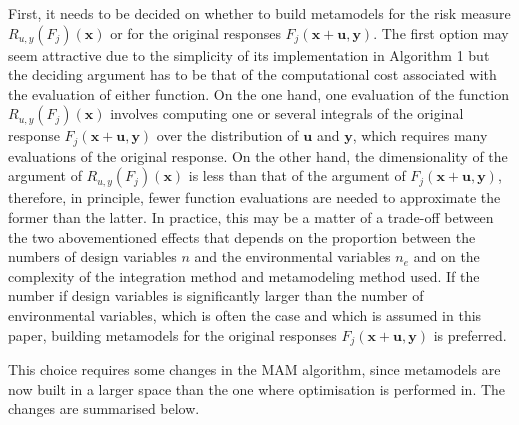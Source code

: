 \documentclass[10pt,twocolumn,a4paper]{article}
\begin{document}
First, it needs to be decided on whether to build metamodels for the risk measure $R_{u,y}(F_j)(\pmb x)$ or for the original responses $F_j (\pmb x+ \pmb u,\pmb y)$. The first option may seem attractive due to the simplicity of its implementation in Algorithm 1 but the deciding argument has to be that of the computational cost associated with the evaluation of either function. On the one hand, one evaluation of the function $R_{u,y}(F_j)(\pmb x)$ involves computing one or several integrals of the original response $F_j(\pmb x+ \pmb u,\pmb y)$ over the distribution of $\pmb u$ and $\pmb y$, which requires many evaluations of the original response. On the other hand, the dimensionality of the argument of $R_{u,y}(F_j)(\pmb x)$ is less than that of the argument of $F_j(\pmb x+ \pmb u,\pmb y)$, therefore, in principle, fewer function evaluations are needed to approximate the former than the latter. In practice, this may be a matter of a trade-off between the two abovementioned effects that depends on the proportion between the numbers of design variables $n$ and the environmental variables $n_e$ and on the complexity of the integration method and metamodeling method used. If the number if design variables is significantly larger than the number of environmental variables, which is often the case and which is assumed in this paper, building metamodels for the original responses $F_j(\pmb x+ \pmb u,\pmb y)$ is preferred.

This choice requires some changes in the MAM algorithm, since metamodels are now built in a larger space than the one where optimisation is performed in. The changes are summarised below.
\end{document}
